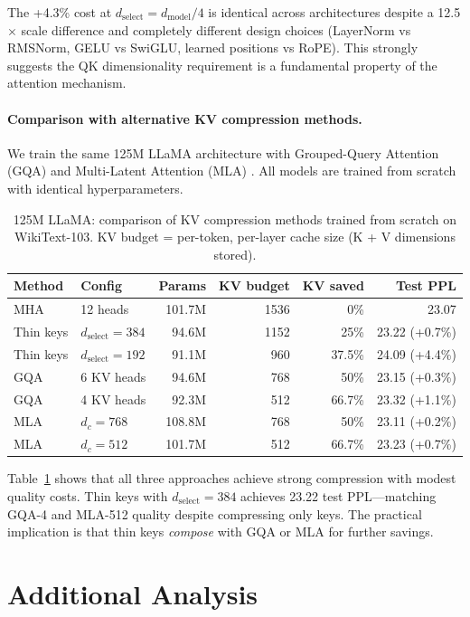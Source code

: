 \documentclass{article} %
\newcommand{\dmodel}{d_{\text{model}}}
\newcommand{\dselect}{d_{\text{select}}}
\begin{document}
The +4.3\% cost at $\dselect = \dmodel/4$ is identical across architectures despite a 12.5$\times$ scale difference and completely different design choices (LayerNorm vs RMSNorm, GELU vs SwiGLU, learned positions vs RoPE). This strongly suggests the QK dimensionality requirement is a fundamental property of the attention mechanism.

\paragraph{Comparison with alternative KV compression methods.}
We train the same 125M LLaMA architecture with Grouped-Query Attention (GQA) \citep{ainslie2023gqa} and Multi-Latent Attention (MLA) \citep{liu2024deepseek}. All models are trained from scratch with identical hyperparameters.

\begin{table}[h]
\centering
\caption{125M LLaMA: comparison of KV compression methods trained from scratch on WikiText-103. KV budget = per-token, per-layer cache size (K + V dimensions stored).}
\label{tab:kv_methods}
\begin{tabular}{llrrrr}
\toprule
Method & Config & Params & KV budget & KV saved & Test PPL \\
\midrule
MHA & 12 heads & 101.7M & 1536 & 0\% & 23.07 \\
\midrule
Thin keys & $\dselect = 384$ & 94.6M & 1152 & 25\% & 23.22 (+0.7\%) \\
Thin keys & $\dselect = 192$ & 91.1M & 960 & 37.5\% & 24.09 (+4.4\%) \\
\midrule
GQA & 6 KV heads & 94.6M & 768 & 50\% & 23.15 (+0.3\%) \\
GQA & 4 KV heads & 92.3M & 512 & 66.7\% & 23.32 (+1.1\%) \\
\midrule
MLA & $d_c = 768$ & 108.8M & 768 & 50\% & 23.11 (+0.2\%) \\
MLA & $d_c = 512$ & 101.7M & 512 & 66.7\% & 23.23 (+0.7\%) \\
\bottomrule
\end{tabular}
\end{table}

Table~\ref{tab:kv_methods} shows that all three approaches achieve strong compression with modest quality costs. Thin keys with $\dselect = 384$ achieves 23.22 test PPL---matching GQA-4 and MLA-512 quality despite compressing only keys. The practical implication is that thin keys \emph{compose} with GQA or MLA for further savings.

\section{Additional Analysis}\label{app:analysis}
\end{document}
